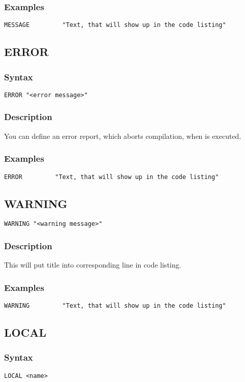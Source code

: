         \subsubsection{Examples}
            \verb'MESSAGE         "Text, that will show up in the code listing"'

    \subsection{ERROR}
        \subsubsection{Syntax}
            \verb'ERROR "<error message>"'

        \subsubsection{Description}
            You can define an error report, which aborts compilation, when is executed.

        \subsubsection{Examples}
            \verb'ERROR         "Text, that will show up in the code listing"'

    \subsection{WARNING}
            \verb'WARNING "<warning message>"'

        \subsubsection{Description}
            This will put title into corresponding line in code listing.

        \subsubsection{Examples}
            \verb'WARNING         "Text, that will show up in the code listing"'

    \subsection{LOCAL}
        \subsubsection{Syntax}
            \verb'LOCAL <name>'

